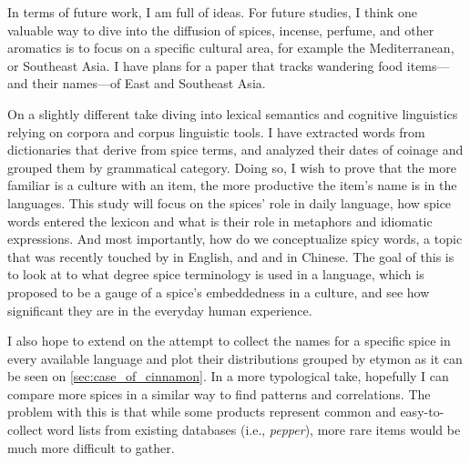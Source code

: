 In terms of future work, I am full of ideas. For future studies, I think one valuable way to dive into the diffusion of spices, incense, perfume, and other aromatics is to focus on a specific cultural area, for example the Mediterranean, or Southeast Asia. I have plans for a paper that tracks wandering food items---and their names---of East and Southeast Asia. 


On a slightly different take diving into lexical semantics and cognitive linguistics relying on corpora and corpus linguistic tools. I have extracted words from dictionaries that derive from spice terms, and analyzed their dates of coinage and grouped them by grammatical category. Doing so, I wish to prove that the more familiar is a culture with an item, the more productive the item's name is in the languages. This study will focus on the spices' role in daily language, how spice words entered the lexicon and what is their role in metaphors and idiomatic expressions. And most importantly, how do we conceptualize spicy words, a topic that was recently touched by \textcite{bagli_tastes_2021} in English, and \textcite{dong_corpus-based_2018} and \textcite{zhong_bodily_2021} in Chinese. The goal of this is to  look at to what degree spice terminology is used in a language, which is proposed to be a gauge of a spice's embeddedness in a culture, and see how significant they are in the everyday human experience.

I also hope to extend on the attempt to collect the names for a specific spice in every available language and plot their distributions grouped by etymon as it can be seen on \cref{sec:case_of_cinnamon}. In a more typological take, hopefully I can compare more spices in a similar way to find patterns and correlations. The problem with this is that while some products represent common and easy-to-collect word lists from existing databases (i.e., \textit{pepper}), more rare items would be much more difficult to gather. 

